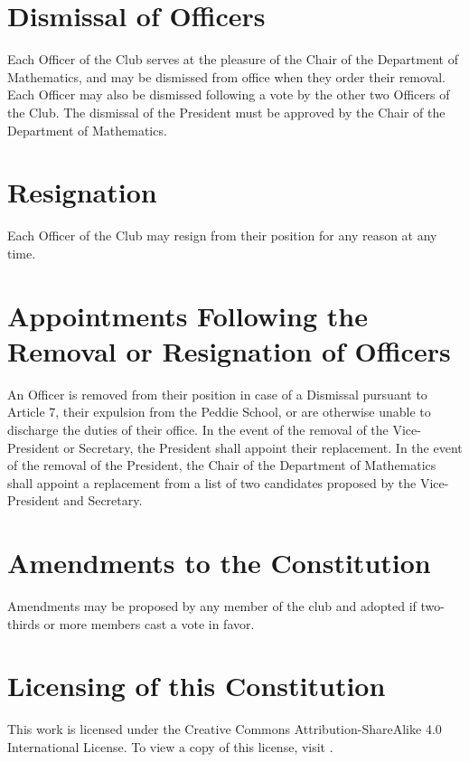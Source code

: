 \documentclass[12pt, letterpaper]{article}
\begin{document}
\section{Dismissal of Officers}
Each Officer of the Club serves at the pleasure of the Chair of the Department of Mathematics, and may be dismissed from office when they order their removal. Each Officer may also be dismissed following a vote by the other two Officers of the Club. The dismissal of the President must be approved by the Chair of the Department of Mathematics. 

\section{Resignation}
Each Officer of the Club may resign from their position for any reason at any time.

\section{Appointments Following the Removal or Resignation of Officers}
An Officer is removed from their position in case of a Dismissal pursuant to Article 7, their expulsion from the Peddie School, or are otherwise unable to discharge the duties of their office. In the event of the removal of the Vice-President or Secretary, the President shall appoint their replacement. In the event of the removal of the President, the Chair of the Department of Mathematics shall appoint a replacement from a list of two candidates proposed by the Vice-President and Secretary.

\section{Amendments to the Constitution}
Amendments may be proposed by any member of the club and adopted if  two-thirds or more members cast a vote in favor.

\section{Licensing of this Constitution}
This work is licensed under the Creative Commons Attribution-ShareAlike 4.0 International License. To view a copy of this license, visit \underline{\href{https://creativecommons.org/licenses/by-sa/4.0/}{\color{blue}{https://creativecommons.org/licenses/by-sa/4.0/}}}.
\end{document}
